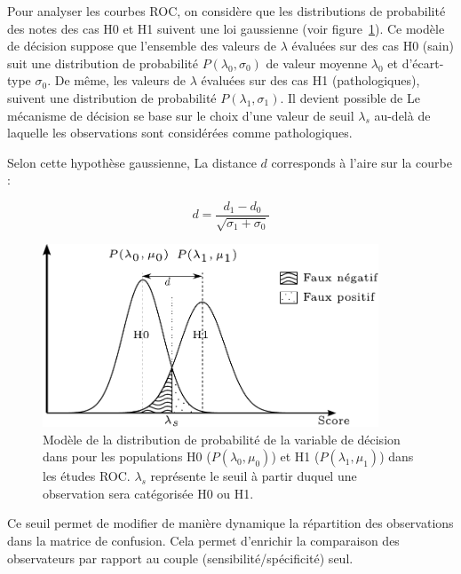 Pour analyser les courbes ROC, on considère que les distributions de probabilité des notes des cas H0 et H1 suivent une loi gaussienne (voir figure~\ref{fig:loiROC}). Ce modèle de décision suppose que l'ensemble des valeurs de $\lambda$ évaluées sur des cas H0 (sain) suit une distribution de probabilité $P(\lambda_0, \sigma_0)$ de valeur moyenne $\lambda_0$ et d'écart-type $\sigma_0$. De même, les valeurs de $\lambda$ évaluées sur des cas H1 (pathologiques), suivent une distribution de probabilité $P(\lambda_1, \sigma_1)$. Il devient possible de Le mécanisme de décision se base sur le choix d'une valeur de seuil $\lambda_s$ au-delà de laquelle les observations sont considérées comme pathologiques.

Selon cette hypothèse gaussienne, La distance $d$ corresponds à l'aire sur la courbe :


\begin{equation}
 d= \frac{d_1 - d_0}{\sqrt{\sigma_1 + \sigma_0}}
\end{equation}

\begin{figure}[h]
	
	\label{fig:loiROC}
	\begin{center}
	\includegraphics[width=10cm]{images/loiROC}
	\vspace{-0.5cm} %
	\end{center}
	\caption{Modèle de la distribution de probabilité de la variable de décision dans pour les populations H0 ($P(\lambda_0, \mu_0)$) et H1 ($P(\lambda_1, \mu_1)$) dans les études ROC. $\lambda_s$ représente le seuil à partir duquel une observation sera catégorisée H0 ou H1.}
\end{figure}


Ce seuil permet de modifier de manière dynamique la répartition des observations dans la matrice de confusion.  Cela permet d'enrichir la comparaison des observateurs par rapport au couple (sensibilité/spécificité) seul.


